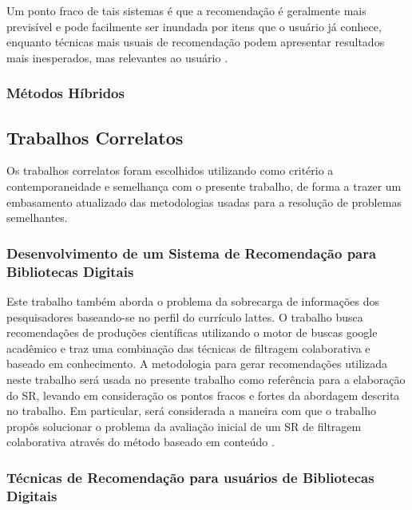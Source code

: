 \documentclass[12pt]{article}
\begin{document}
Um ponto fraco de tais sistemas é que a recomendação é geralmente mais previsível e pode facilmente ser inundada por itens que o 
usuário já conhece, enquanto técnicas mais usuais de recomendação podem apresentar resultados mais inesperados, mas relevantes ao 
usuário \cite{sinha2001comparing}.

\subsubsection{Métodos Híbridos}

\subsection{Trabalhos Correlatos}

Os trabalhos correlatos foram escolhidos utilizando como critério a contemporaneidade e semelhança com o presente trabalho, 
de forma a trazer um embasamento atualizado das metodologias usadas para a resolução de problemas semelhantes.

\subsubsection{Desenvolvimento de um Sistema de Recomendação para Bibliotecas Digitais}

Este trabalho também aborda o problema da sobrecarga de informações dos pesquisadores baseando-se no perfil do currículo lattes. 
O trabalho busca recomendações de produções científicas utilizando o motor de buscas google acadêmico e traz uma combinação 
das técnicas de filtragem colaborativa e baseado em conhecimento. A metodologia para gerar recomendações utilizada neste 
trabalho será usada no presente trabalho como referência para a elaboração do SR, levando em consideração os pontos fracos 
e fortes da abordagem descrita no trabalho. Em particular, será considerada a maneira com que o trabalho propôs solucionar 
o problema  da avaliação inicial de um SR de filtragem colaborativa através do método baseado em conteúdo \cite{da2018desenvolvimento}.

\subsubsection{Técnicas de Recomendação para usuários de Bibliotecas
Digitais}
\end{document}
